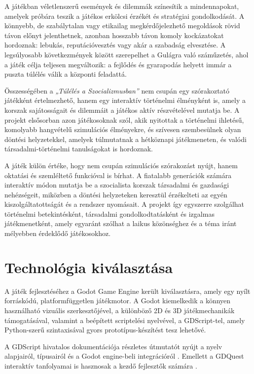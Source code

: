 \documentclass[12pt,a4paper]{article}
\begin{document}
A játékban véletlenszerű események és dilemmák színesítik a mindennapokat, amelyek próbára teszik a játékos erkölcsi érzékét és stratégiai gondolkodását. A könnyebb, de szabálytalan vagy etikailag megkérdőjelezhető megoldások rövid távon előnyt jelenthetnek, azonban hosszabb távon komoly kockázatokat hordoznak: lebukás, reputációvesztés vagy akár a szabadság elvesztése. A legsúlyosabb következmények között szerepelhet a Gulágra való száműzetés, ahol a játék célja teljesen megváltozik: a fejlődés és gyarapodás helyett immár a puszta túlélés válik a központi feladattá.

Összességében a \emph{„Túlélés a Szocializmusban”} nem csupán egy szórakoztató játékként értelmezhető, hanem egy interaktív történelmi élményként is, amely a korszak sajátosságait és dilemmáit a játékos aktív részvételével mutatja be. A projekt elsősorban azon játékosoknak szól, akik nyitottak a történelmi ihletésű, komolyabb hangvételű szimulációs élményekre, és szívesen szembesülnek olyan döntési helyzetekkel, amelyek túlmutatnak a hétköznapi játékmeneten, és valódi társadalmi-történelmi tanulságokat is hordoznak.

A játék külön értéke, hogy nem csupán szimulációs szórakozást nyújt, hanem oktatási és szemléltető funkcióval is bírhat. A fiatalabb generációk számára interaktív módon mutatja be a szocialista korszak társadalmi és gazdasági nehézségeit, miközben a döntési helyzeteken keresztül érzékelteti az egyén kiszolgáltatottságát és a rendszer nyomásait. A projekt így egyszerre szolgálhat történelmi betekintésként, társadalmi gondolkodtatásként és izgalmas játékmenetként, amely egyaránt szólhat a laikus közönséghez és a téma iránt mélyebben érdeklődő játékosokhoz.

\section{Technológia kiválasztása}

A játék fejlesztéséhez a Godot Game Engine került kiválasztásra, amely egy nyílt forráskódú, platformfüggetlen játékmotor. A Godot kiemelkedik a könnyen használható vizuális szerkesztőjével, a különböző 2D és 3D játékmechanikák támogatásával, valamint a beépített scriptelési nyelvével, a GDScript-tel, amely Python-szerű szintaxisával gyors prototípus-készítést tesz lehetővé.

A GDScript hivatalos dokumentációja részletes útmutatót nyújt a nyelv alapjairól, típusairól és a Godot engine-beli integrációról \cite{gdscript_basics,gdscript_learn}. Emellett a GDQuest interaktív tanfolyamai is hasznosak a kezdő fejlesztők számára \cite{gdquest_gdscript}.
\end{document}
